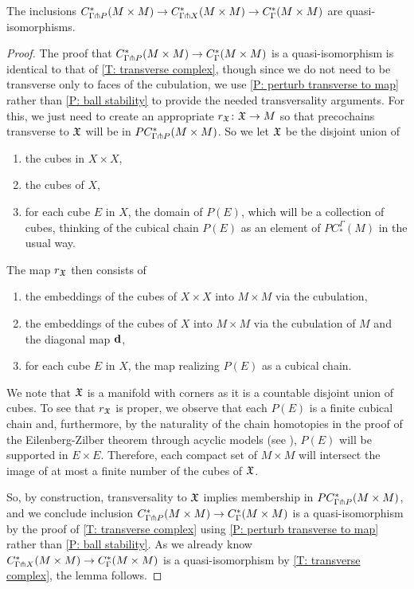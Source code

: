 \documentclass{amsart}
\begin{document}
\begin{lemma}\label{L: P-transverse iso}
	The inclusions $C^*_{\Gamma \pitchfork P} (M \times M) \to C^*_{\Gamma \pitchfork X} (M \times M) \to C^*_\Gamma (M \times M)$ are quasi-isomorphisms.
\end{lemma}
\begin{proof}
	The proof that $C^*_{\Gamma \pitchfork P} (M \times M)  \to C^*_\Gamma (M \times M)$ is a quasi-isomorphism is identical to that of \cref{T: transverse complex}, though since we do not need to be transverse only to faces of the cubulation, we use \cref{P: perturb transverse to map} rather than \cref{P: ball stability} to provide the needed transversality arguments.
	For this, we just need to create an appropriate $r_{\mathfrak X}  \colon \mathfrak X \to M$ so that precochains transverse to $\mathfrak X$ will be in $PC^*_{\Gamma \pitchfork P} (M \times M)$.
	So we let $\mathfrak X$ be the disjoint union of
	\begin{enumerate}
		\item the cubes in $X \times X$,
		\item the cubes of $X$,
		\item for each cube $E$ in $X$, the domain of $P(E)$, which will be a collection of cubes, thinking of the cubical chain $P(E)$ as an element of $PC^\Gamma_*(M)$ in the usual way.
	\end{enumerate}
	The map $r_{\mathfrak X}$ then consists of
	\begin{enumerate}
		\item the embeddings of the cubes of $X \times X$ into $M \times M$ via the cubulation,
		\item the embeddings of the cubes of $X$ into $M \times M$ via the cubulation of $M$ and the diagonal map $\mathbf{d}$,
		\item for each cube $E$ in $X$, the map realizing $P(E)$ as a cubical chain.
	\end{enumerate}
	We note that $\mathfrak X$ is a manifold with corners as it is a countable disjoint union of cubes.
	To see that $r_{\mathfrak X}$ is proper, we observe that each $P(E)$ is a finite cubical chain and, furthermore, by the naturality of the chain homotopies in the proof of the Eilenberg-Zilber theorem through acyclic models (see \cite[Section XI.5]{Mas91}), $P(E)$ will be supported in $E \times E$.
	Therefore, each compact set of $M \times M$ will intersect the image of at most a finite number of the cubes of $\mathfrak X$.

	So, by construction, transversality to $\mathfrak X$ implies membership in $PC^*_{\Gamma \pitchfork P} (M \times M)$, and we conclude inclusion $C^*_{\Gamma \pitchfork P} (M \times M) \to C^*_\Gamma (M \times M)$ is a quasi-isomorphism by the proof of \cref{T: transverse complex} using \cref{P: perturb transverse to map} rather than \cref{P: ball stability}.
	As we already know $C^*_{\Gamma \pitchfork X} (M \times M) \to C^*_\Gamma (M \times M)$ is a quasi-isomorphism by \cref{T: transverse complex}, the lemma follows.
\end{proof}
\end{document}
